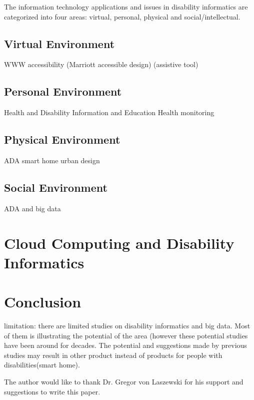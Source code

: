 \documentclass[sigconf]{acmart}
\begin{document}
 The information technology applications and issues in disability informatics are categorized into four
 areas: virtual, personal, physical and social/intellectual.
 
\subsection{Virtual Environment}

WWW accessibility (Marriott accessible design) (assistive tool)
 
\subsection{Personal Environment}


Health and Disability Information and Education
Health monitoring

\subsection{Physical Environment}
ADA
smart home \cite{dewsbury03}
urban design

\subsection{Social Environment}
ADA and big data

\section{Cloud Computing and Disability Informatics}

\section{Conclusion}

limitation: there are limited studies on disability informatics and big data. Most of them is illustrating the potential of the area (however these potential studies have been around for decades. The potential and suggestions made by previous studies may result in other product instead of products for people with disabilities(smart home). 


\begin{acks}

  The author would like to thank Dr. Gregor von Laszewski for his
  support and suggestions to write this paper.

\end{acks}


 

\appendix
\end{document}

